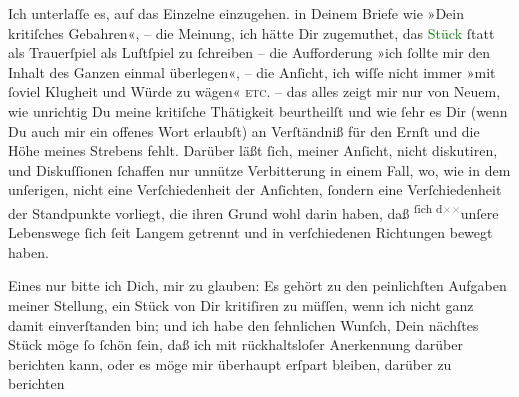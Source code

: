 \pstart
           Ich unterlaſſe es, auf das Einzelne {\pb}einzugehen.
                  \label{K_L03440-3v}\label{K_L03440-3h} in Deinem Briefe wie »Dein kritiſches Gebahren«, – die
               Meinung, ich hätte Dir zugemuthet, das \textcolor{green}{Stück}{}\ledrightnote{{$\rightarrow$}\textcolor{green}{Der einsame Weg. Schauspiel in fünf Akten}} ſtatt als Trauerſpiel als Luſtſpiel zu ſchreiben – die
               Aufforderung »ich ſollte  mir den Inhalt des Ganzen
               einmal überlegen«, – die Anſicht, ich wiſſe nicht immer »mit ſoviel Klugheit und
               Würde zu wägen« \textsc{etc.} – das alles zeigt mir nur von Neuem,
               wie unrichtig Du  meine kritiſche Thätigkeit
               beurtheilſt und \strikeout{\textcolor{gray}{mit}} wie ſehr es Dir (wenn Du auch mir ein offenes Wort erlaubſt) an Verſtändniß
               für den Ernſt und die Höhe meines Strebens fehlt. Darüber läßt ſich, meiner Anſicht,
               nicht diskutiren, und Diskuſſionen ſchaffen nur 
               unnütze Verbitterung in einem Fall, wo, wie in dem {\pb}unſerigen, nicht eine Verſchiedenheit der Anſichten, ſondern eine Verſchiedenheit
               der Standpunkte vorliegt, die ihren Grund wohl darin haben, daß \substVorne{}\textsuperscript{ſich d\textcolor{gray}{×}\-\textcolor{gray}{×}}{\allowbreak}\substDazwischen{}unſere\substHinten{} Lebenswege ſich ſeit Langem getrennt und in verſchiedenen Richtungen bewegt
               haben.\pend
           
\pstart
           Eines nur bitte ich Dich, mir zu glauben: Es gehört zu den peinlichſten Aufgaben
               meiner Stellung, ein Stück von Dir \strikeout{\textcolor{gray}{×}} kritiſiren zu müſſen, wenn ich nicht ganz damit einverſtanden bin; und ich
               habe den ſehnlichen Wunſch, Dein nächſtes Stück möge ſo ſchön ſein, daß ich mit
               rückhaltsloſer Anerkennung darüber berichten kann, oder es \strikeout{\textcolor{gray}{×}} möge mir überhaupt erſpart bleiben, darüber zu berichten{\dotsfive}\pend
           
